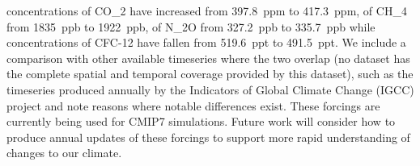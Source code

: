 concentrations of CO_2 have increased from 397.8~ppm to 417.3~ppm,
of CH_4 from 1835~ppb to 1922~ppb,
of N_2O from 327.2~ppb to 335.7~ppb
while concentrations of CFC-12 have fallen from 519.6~ppt to 491.5~ppt.
We include a comparison with other available timeseries where the two overlap
(no dataset has the complete spatial and temporal coverage provided by this dataset),
such as the timeseries produced annually by the Indicators of Global Climate Change (IGCC) project
and note reasons where notable differences exist.
These forcings are currently being used for CMIP7 simulations.
Future work will consider how to produce annual updates of these forcings
to support more rapid understanding of changes to our climate.
